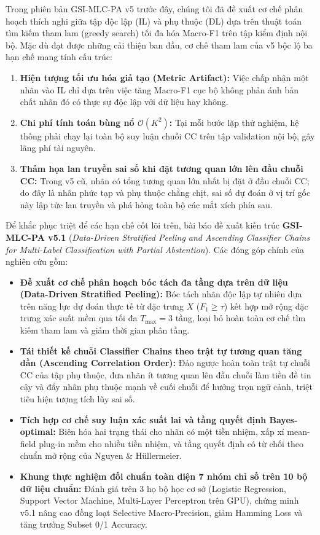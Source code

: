 \documentclass[11pt,a4paper]{article}
\begin{document}
Trong phiên bản GSI-MLC-PA v5 trước đây, chúng tôi đã đề xuất cơ chế phân hoạch thích nghi giữa tập độc lập (IL) và phụ thuộc (DL) dựa trên thuật toán tìm kiếm tham lam (greedy search) tối đa hóa Macro-F1 trên tập kiểm định nội bộ. Mặc dù đạt được những cải thiện ban đầu, cơ chế tham lam của v5 bộc lộ ba hạn chế mang tính cấu trúc:
\begin{enumerate}
    \item \textbf{Hiện tượng tối ưu hóa giả tạo (Metric Artifact):} Việc chấp nhận một nhãn vào IL chỉ dựa trên việc tăng Macro-F1 cục bộ không phản ánh bản chất nhãn đó có thực sự độc lập với dữ liệu hay không.
    \item \textbf{Chi phí tính toán bùng nổ $\mathcal{O}(K^2)$:} Tại mỗi bước lặp thử nghiệm, hệ thống phải chạy lại toàn bộ suy luận chuỗi CC trên tập validation nội bộ, gây lãng phí tài nguyên.
    \item \textbf{Thảm họa lan truyền sai số khi đặt tương quan lớn lên đầu chuỗi CC:} Trong v5 cũ, nhãn có tổng tương quan lớn nhất bị đặt ở đầu chuỗi CC; do đây là nhãn phức tạp và phụ thuộc chằng chịt, sai số dự đoán ở vị trí gốc này lập tức lan truyền và phá hỏng toàn bộ các mắt xích phía sau.
\end{enumerate}

Để khắc phục triệt để các hạn chế cốt lõi trên, bài báo đề xuất kiến trúc \textbf{GSI-MLC-PA v5.1} (\textit{Data-Driven Stratified Peeling and Ascending Classifier Chains for Multi-Label Classification with Partial Abstention}). Các đóng góp chính của nghiên cứu gồm:
\begin{itemize}
    \item \textbf{Đề xuất cơ chế phân hoạch bóc tách đa tầng dựa trên dữ liệu (Data-Driven Stratified Peeling):} Bóc tách nhãn độc lập tự nhiên dựa trên năng lực dự đoán thực tế từ đặc trưng $X$ ($F_1 \ge \tau$) kết hợp mở rộng đặc trưng xác suất mềm qua tối đa $T_{\max} = 3$ tầng, loại bỏ hoàn toàn cơ chế tìm kiếm tham lam và giảm thời gian phân tầng.
    \item \textbf{Tái thiết kế chuỗi Classifier Chains theo trật tự tương quan tăng dần (Ascending Correlation Order):} Đảo ngược hoàn toàn trật tự chuỗi CC của tập phụ thuộc, đưa nhãn ít tương quan lên đầu chuỗi làm tiền đề tin cậy và đẩy nhãn phụ thuộc mạnh về cuối chuỗi để hưởng trọn ngữ cảnh, triệt tiêu hiện tượng tích lũy sai số.
    \item \textbf{Tích hợp cơ chế suy luận xác suất lai và tầng quyết định Bayes-optimal:} Biên hóa hai trạng thái cho nhãn có một tiền nhiệm, xấp xỉ mean-field plug-in mềm cho nhiều tiền nhiệm, và tầng quyết định có từ chối theo chuẩn mở rộng của Nguyen \& Hüllermeier.
    \item \textbf{Khung thực nghiệm đối chuẩn toàn diện 7 nhóm chỉ số trên 10 bộ dữ liệu chuẩn:} Đánh giá trên 3 họ bộ học cơ sở (Logistic Regression, Support Vector Machine, Multi-Layer Perceptron trên GPU), chứng minh v5.1 nâng cao đồng loạt Selective Macro-Precision, giảm Hamming Loss và tăng trưởng Subset 0/1 Accuracy.
\end{itemize}
\end{document}
